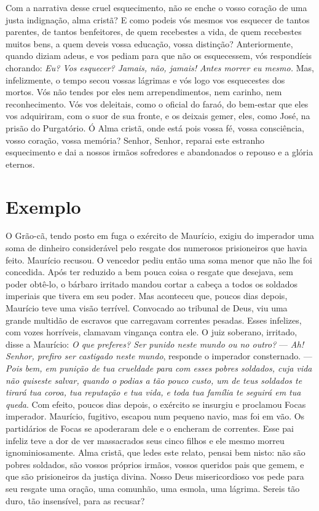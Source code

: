 Com a narrativa desse cruel esquecimento, não se enche o vosso coração de uma justa indignação, alma cristã? E como podeis vós mesmos vos esquecer de tantos parentes, de tantos benfeitores, de quem recebestes a vida, de quem recebestes muitos bens, a quem deveis vossa educação, vossa distinção? Anteriormente, quando diziam adeus, e vos pediam para que não os esquecessem, vós respondíeis chorando: \textit{Eu? Vos esquecer? Jamais, não, jamais! Antes morrer eu mesmo.} Mas, infelizmente, o tempo secou vossas lágrimas e vós logo vos esquecestes dos mortos. Vós não tendes por eles nem arrependimentos, nem carinho, nem reconhecimento. Vós vos deleitais, como o oficial do faraó, do bem-estar que eles vos adquiriram, com o suor de sua fronte, e os deixais gemer, eles, como José, na prisão do Purgatório. Ó Alma cristã, onde está pois vossa fé, vossa consciência, vosso coração, vossa memória? Senhor, Senhor, reparai este estranho esquecimento e dai a nossos irmãos sofredores e abandonados o repouso e a glória eternos.


\section*{Exemplo }

O Grão-cã, tendo posto em fuga o exército de Maurício, exigiu do imperador uma soma de dinheiro considerável pelo resgate dos numerosos prisioneiros que havia feito. Maurício recusou. O vencedor pediu então uma soma menor que não lhe foi concedida. Após ter reduzido a bem pouca coisa o resgate que desejava, sem poder obtê-lo, o bárbaro irritado mandou cortar a cabeça a todos os soldados imperiais que tivera em seu poder. Mas aconteceu que, poucos dias depois, Maurício teve uma visão terrível. Convocado ao tribunal de Deus, viu uma grande multidão de escravos que carregavam correntes pesadas. Esses infelizes, com vozes horríveis, clamavam vingança contra ele. O juiz soberano, irritado, disse a Maurício: \textit{O que preferes? Ser punido neste mundo ou no outro?} --- \textit{Ah! Senhor, prefiro ser castigado neste mundo}, responde o imperador consternado. --- \textit{Pois bem, em punição de tua crueldade para com esses pobres soldados, cuja vida não quiseste salvar, quando o podias a tão pouco custo, um de teus soldados te tirará tua coroa, tua reputação e tua vida, e toda tua família te seguirá em tua queda}. Com efeito, poucos dias depois, o exército se insurgiu e proclamou Focas imperador. Maurício, fugitivo, escapou num pequeno navio, mas foi em vão. Os partidários de Focas se apoderaram dele e o encheram de correntes. Esse pai infeliz teve a dor de ver massacrados seus cinco filhos e ele mesmo morreu ignominiosamente. Alma cristã, que ledes este relato, pensai bem nisto: não são pobres soldados, são vossos próprios irmãos, vossos queridos pais que gemem, e que são prisioneiros da justiça divina. Nosso Deus misericordioso vos pede para seu resgate uma oração, uma comunhão, uma esmola, uma lágrima. Sereis tão duro, tão insensível, para as recusar?


